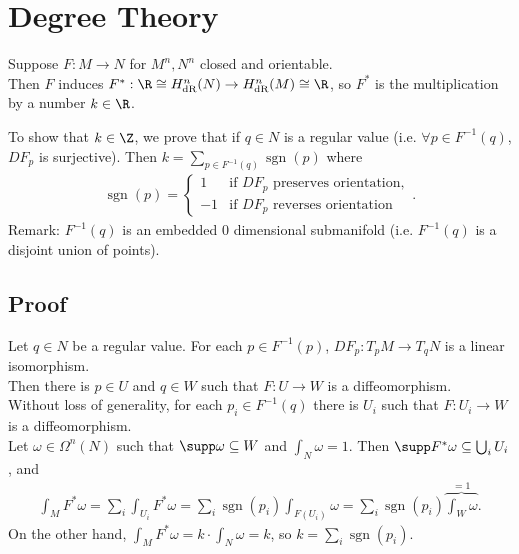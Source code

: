 \documentclass[11pt]{article}
\begin{document}
\section*{Degree Theory}
\label{sec:orgf7d2874}
Suppose \(F:M\to N\) for \(M^{n}, N^{n}\) closed and orientable.\\
Then \(F\) induces \(F^{*}:\R\cong H^{n}_{\text{dR}}(N)\to H^{n}_{\text{dR}}(M)\cong\R\), so \(F^{*}\) is the multiplication by a number \(k\in\R\).\\
To show that \(k\in\Z\), we prove that if \(q\in N\) is a regular value (i.e. \(\forall p\in F^{-1}(q)\), \(DF_{p}\) is surjective). Then \(k=\sum_{p\in F^{-1}(q)}\operatorname{sgn}(p)\) where\\
\begin{align*}
  \operatorname{sgn}(p)=
  \begin{cases}
    1 & \text{if }DF_{p}\text{ preserves orientation},\\
    -1 & \text{if }DF_{p}\text{ reverses orientation}
  \end{cases}.
\end{align*}
Remark: \(F^{-1}(q)\) is an embedded \(0\) dimensional submanifold (i.e. \(F^{-1}(q)\) is a disjoint union of points).\\
\subsection*{Proof}
\label{sec:org7234093}
Let \(q\in N\) be a regular value. For each \(p\in F^{-1}(p)\), \(DF_{p}:T_{p}M\to T_{q}N\) is a linear isomorphism.\\
Then there is \(p\in U\) and \(q\in W\) such that \(F:U\to W\) is a diffeomorphism.\\
Without loss of generality, for each \(p_{i}\in F^{-1}(q)\) there is \(U_{i}\) such that \(F:U_{i}\to W\) is a diffeomorphism.\\
Let \(\omega\in\Omega^{n}(N)\) such that \(\supp\omega\subseteq W\) and \(\int_{N}\omega=1\). Then \(\supp F^{*}\omega\subseteq \bigcup_{i} U_{i}\), and\\
\begin{align*}
  \int_{M}F^{*}\omega
  =\sum_{i}\int_{U_{i}}F^{*}\omega
  =\sum_{i}\operatorname{sgn}(p_{i})\int_{F(U_{i})}\omega
  =\sum_{i}\operatorname{sgn}(p_{i})\overbrace{\int_{W}\omega}^{=1}.
\end{align*}
On the other hand, \(\int_{M}F^{*}\omega=k\cdot\int_{N}\omega=k\), so \(k=\sum_{i}\operatorname{sgn}(p_{i})\).\\
\end{document}
